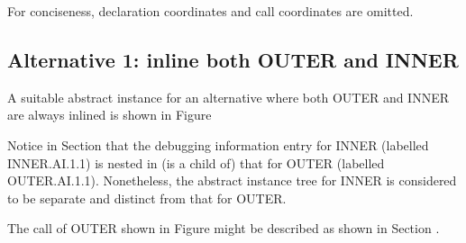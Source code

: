 For conciseness, declaration coordinates and call coordinates are omitted.

\subsection{Alternative 1: inline both OUTER and INNER}
\label{app:inlinebothouterandinner}

A suitable abstract instance for an alternative where both
OUTER and INNER are always inlined is shown in 
Figure 

Notice in 
Section  
that the debugging information entry for
INNER (labelled INNER.AI.1.1) is nested in (is a child of)
that for OUTER (labelled OUTER.AI.1.1). Nonetheless, the
abstract instance tree for INNER is considered to be separate
and distinct from that for OUTER.

The call of OUTER shown in 
Figure 
might be described as
shown in 
Section .


